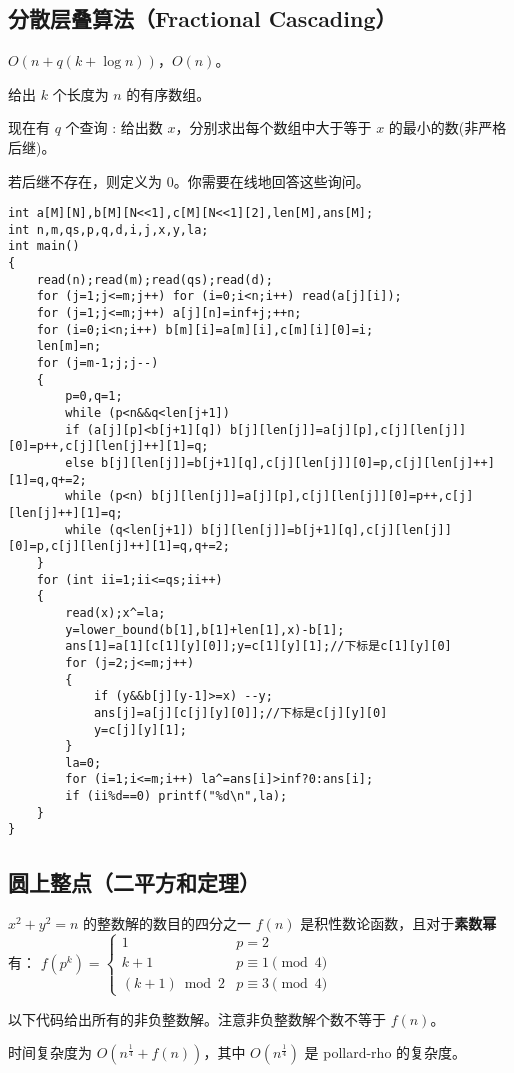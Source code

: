 \documentclass[12pt]{ctexart}
\begin{document}
\subsection{分散层叠算法（Fractional Cascading）}

$O(n+q(k+\log n))$，$O(n)$。

给出 $k$ 个长度为 $n$ 的有序数组。

现在有 $q$ 个查询 : 给出数 $x$，分别求出每个数组中大于等于 $x$ 的最小的数(非严格后继)。

若后继不存在，则定义为 $0$。你需要在线地回答这些询问。

\begin{lstlisting}
int a[M][N],b[M][N<<1],c[M][N<<1][2],len[M],ans[M];
int n,m,qs,p,q,d,i,j,x,y,la;
int main()
{
	read(n);read(m);read(qs);read(d);
	for (j=1;j<=m;j++) for (i=0;i<n;i++) read(a[j][i]);
	for (j=1;j<=m;j++) a[j][n]=inf+j;++n;
	for (i=0;i<n;i++) b[m][i]=a[m][i],c[m][i][0]=i;
	len[m]=n;
	for (j=m-1;j;j--)
	{
		p=0,q=1;
		while (p<n&&q<len[j+1]) 
		if (a[j][p]<b[j+1][q]) b[j][len[j]]=a[j][p],c[j][len[j]][0]=p++,c[j][len[j]++][1]=q;
		else b[j][len[j]]=b[j+1][q],c[j][len[j]][0]=p,c[j][len[j]++][1]=q,q+=2;
		while (p<n) b[j][len[j]]=a[j][p],c[j][len[j]][0]=p++,c[j][len[j]++][1]=q;
		while (q<len[j+1]) b[j][len[j]]=b[j+1][q],c[j][len[j]][0]=p,c[j][len[j]++][1]=q,q+=2;
	}
	for (int ii=1;ii<=qs;ii++)
	{
		read(x);x^=la;
		y=lower_bound(b[1],b[1]+len[1],x)-b[1];
		ans[1]=a[1][c[1][y][0]];y=c[1][y][1];//下标是c[1][y][0]
		for (j=2;j<=m;j++) 
		{
			if (y&&b[j][y-1]>=x) --y;
			ans[j]=a[j][c[j][y][0]];//下标是c[j][y][0]
			y=c[j][y][1];
		}
		la=0;
		for (i=1;i<=m;i++) la^=ans[i]>inf?0:ans[i];
		if (ii%d==0) printf("%d\n",la);
	}
}
\end{lstlisting}

\subsection{圆上整点（二平方和定理）}

$x^2+y^2=n$ 的整数解的数目的四分之一 $f(n)$ 是积性数论函数，且对于{\bf{素数幂}}有：
$f(p^k)=\begin{cases}
		1            & p=2               \\
		k+1          & p\equiv 1 \pmod 4 \\
		(k+1)\bmod 2 & p\equiv 3 \pmod 4
	\end{cases}$

以下代码给出所有的非负整数解。注意非负整数解个数不等于 $f(n)$。

时间复杂度为 $O(n^{\frac{1}{4}}+f(n))$，其中 $O(n^{\frac{1}{4}})$ 是 pollard-rho 的复杂度。
\end{document}

